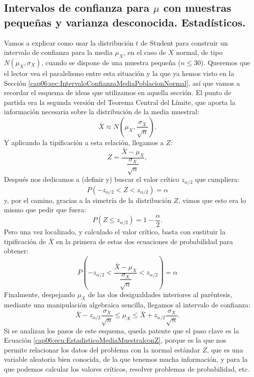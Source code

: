 \subsection{Intervalos de confianza para $\mu$ con muestras pequeñas y varianza desconocida. Estadísticos.}
\label{cap06:subsec:IntConfMediaMuestraPequennaVarianzaDesconocida}

Vamos a explicar como usar la distribución $t$ de Student para construir un
intervalo de confianza para la media $\mu_X$, en el caso de $X$ normal, de tipo
$N(\mu_X,\sigma_X)$, cuando se dispone de una muestra pequeña ($n\leq 30$).
Queremos que el lector vea el paralelismo entre esta situación y la que ya
hemos visto en la Sección
\ref{cap06:sec:IntervaloConfianzaMediaPoblacionNormal}, así que vamos a
recordar el esquema de ideas que utilizamos en aquella sección. El punto de
partida era la segunda versión del Teorema Central del Límite, que aporta la
información necesaria sobre la distribución de la media muestral:
    \[\bar X \approx N\left(\mu_X,\dfrac{\sigma_X}{\sqrt{n}}\right).\]
Y aplicando la tipificación a esta relación, llegamos a $Z$:
    \begin{equation}\label{cap06:ecu:EstadisticoMediaMuestralconZ}
    Z=\dfrac{\bar X-\mu_X}{\dfrac{\sigma_X}{\sqrt{n}}},
    \end{equation}
Después nos dedicamos a (definir y) buscar el valor crítico $z_{\alpha/2}$ que
cumpliera:
    \[P\left(-z_{\alpha/2}<Z<z_{\alpha/2}\right)=\alpha\]
y, por el camino, gracias a la simetría de la distribución $Z$, vimos que esto
era lo mismo que pedir que fuera:
    \[P\left(Z\leq z_{\alpha/2}\right)=1-\dfrac{\alpha}{2}.\]
Pero una vez localizado, y calculado el valor crítico, basta con sustituir la
tipificación de $\bar X$ en la primera de estas dos ecuaciones de probabilidad
para obtener:
    \[P\left(-z_{\alpha/2}<\dfrac{\bar X-\mu_X}{\dfrac{\sigma_X}{\sqrt{n}}}
    <z_{\alpha/2}\right)=\alpha\]
Finalmente, despejando $\mu_X$ de las dos desigualdades interiores al
paréntesis, mediante una manipulación algebraica sencilla, llegamos al
intervalo de confianza:
    \[\bar X-z_{\alpha/2}\dfrac{\sigma_X}{\sqrt{n}}\leq \mu_X \leq \bar X+z_{\alpha/2}\dfrac{\sigma_X}{\sqrt{n}}.\]
Si se analizan los pasos de este esquema, queda patente que el paso clave es la
Ecuación \ref{cap06:ecu:EstadisticoMediaMuestralconZ}, porque es la que nos
permite relacionar los datos del problema con la normal estándar $Z$, que es
una variable aleatoria bien conocida, de la que tenemos mucha información, y
para la que podemos calcular los valores críticos, resolver problemas de
probabilidad, etc.

